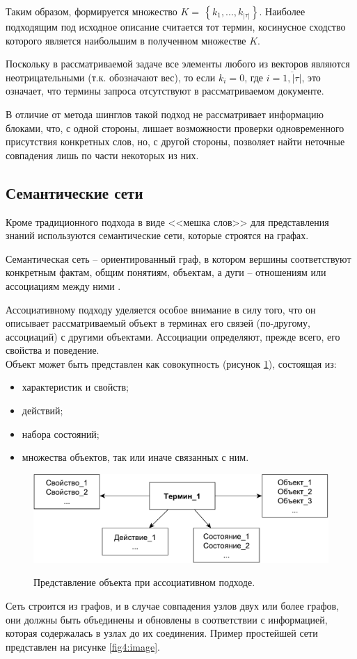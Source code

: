 Таким образом, формируется множество 	$K = \, \left\lbrace k_1, ..., k_{|\tau|} \right\rbrace $. Наиболее подходящим под исходное описание считается тот термин, косинусное сходство которого является наибольшим в полученном множестве $K$.

Поскольку в рассматриваемой задаче все элементы любого из векторов являются неотрицательными (т.к. обозначают вес), то если $k_i = 0$, где  $i = \overline{1, |\tau|}$, это означает, что термины запроса отсутствуют в рассматриваемом документе. 

В отличие от метода шинглов такой подход не рассматривает информацию блоками, что, с одной стороны, лишает возможности проверки одновременного присутствия конкретных слов, но, с другой стороны, позволяет найти неточные совпадения лишь по части некоторых из них.\newline

\subsection{Семантические сети}
Кроме традиционного подхода в виде <<мешка слов>> для представления знаний используются семантические сети, которые строятся на графах.

Семантическая сеть -- ориентированный граф, в котором вершины соответствуют конкретным фактам, общим понятиям, объектам, а дуги -- отношениям или ассоциациям между ними \cite{network}.

Ассоциативному подходу уделяется особое внимание в силу того, что он описывает рассматриваемый объект в терминах его связей (по-другому, ассоциаций) с другими объектами. Ассоциации определяют, прежде всего, его свойства и поведение.\\
%
Объект может быть представлен как совокупность (рисунок \ref{fig3:image}), состоящая из:
\begin{itemize}
	\item характеристик и свойств;
	\item действий;
	\item набора состояний;
	\item множества объектов, так или иначе связанных с ним.
\end{itemize}

\begin{figure}[h]
	\begin{center}
		{\includegraphics[scale = 0.6]{img/node.pdf}}
		\caption{Представление объекта при ассоциативном подходе.}
		\label{fig3:image}
	\end{center}
\end{figure}
%
Сеть строится из графов, и в случае совпадения узлов двух или более графов, они должны быть объединены и обновлены в соответствии с информацией, которая содержалась в узлах до их соединения. Пример простейшей сети представлен на рисунке \ref{fig4:image}.

